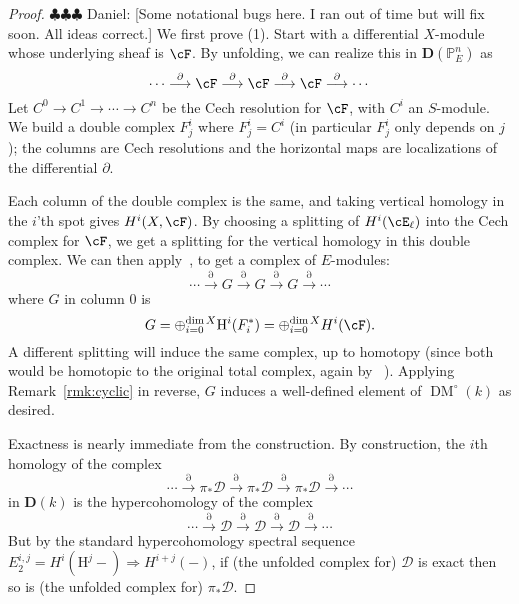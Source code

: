 \documentclass[12pt]{amsart}
\theoremstyle{definition}
\theoremstyle{remark}
\newcommand{\PP}{\mathbb P}
\newcommand{\HH}{\mathrm H}
\newcommand{\DD}{\mathbf D}
\newcommand{\daniel}[1]{{\color{blue} \sf $\clubsuit\clubsuit\clubsuit$ Daniel: [#1]}}
\def\DM{\operatorname{DM}}
\begin{document}
\begin{proof}\daniel{Some notational bugs here.  I ran out of time but will fix soon.  All ideas correct.}
We first prove (1).  Start with a differential $X$-module whose underlying sheaf is $\cF$.  
By unfolding, we can realize this  in $\DD(\PP^n_E)$ as
\[
\cdots \overset{\partial}{\longrightarrow}\cF \overset{\partial}{\longrightarrow} \cF \overset{\partial}{\longrightarrow} \cF\overset{\partial}{\longrightarrow} \cdots
\]
Let $C^0\to C^1\to \cdots \to C^n$ be the Cech resolution for $\cF$, with $C^i$ an $S$-module.
We build a double complex $F^i_j$ where $F^i_j=C^i$ (in particular $F^i_j$ only depends on $j$); the columns are Cech resolutions and the horizontal maps are localizations of the differential $\partial$.

Each column of the double complex is the same, and taking vertical homology in the $i$'th spot gives $H^i(X,\cF)$. By choosing a splitting of $H^i(\cE_\ell)$ into the Cech complex for $\cF$, we get a splitting for the vertical homology in this double complex.  We can then apply~\cite[Lemma~3.5]{EFS}, to get a complex of $E$-modules:
\[
\cdots \overset{\partial}{\longrightarrow} G \overset{\partial}{\longrightarrow} G \overset{\partial}{\longrightarrow}G \overset{\partial}{\longrightarrow} \cdots
\]
where $G$ in column $0$ is
\[
G = \oplus_{i=0}^{\dim X} \HH^i(F^*_i) =  \oplus_{i=0}^{\dim X}H^i(\cF).
\]
A different splitting will induce the same complex, up to homotopy (since both would be homotopic to the original total complex, again by ~\cite[Lemma~3.5]{EFS}).  Applying Remark~\ref{rmk:cyclic} in reverse, $G$ induces a well-defined element of $\DM^\circ(k)$ as desired. 

Exactness is nearly immediate from the construction.  By construction, the $i$th homology of the complex
\[
\cdots \overset{\partial}{\longrightarrow}\pi_*\mathcal D\overset{\partial}{\longrightarrow}\pi_*\mathcal D\overset{\partial}{\longrightarrow}\pi_*\mathcal D\overset{\partial}{\longrightarrow} \cdots
\]
in $\DD(k)$ is the hypercohomology of the complex
\[
\cdots \overset{\partial}{\longrightarrow}\mathcal D\overset{\partial}{\longrightarrow}\mathcal D\overset{\partial}{\longrightarrow}\mathcal D\overset{\partial}{\longrightarrow} \cdots
\]
But by the standard hypercohomology spectral sequence $E^{i,j}_2=H^i (\HH^j -) \Rightarrow H^{i+j}(-)$, if (the unfolded complex for) $\mathcal D$ is exact then so is (the unfolded complex for) $\pi_*\mathcal D$.


\end{proof}
\end{document}
